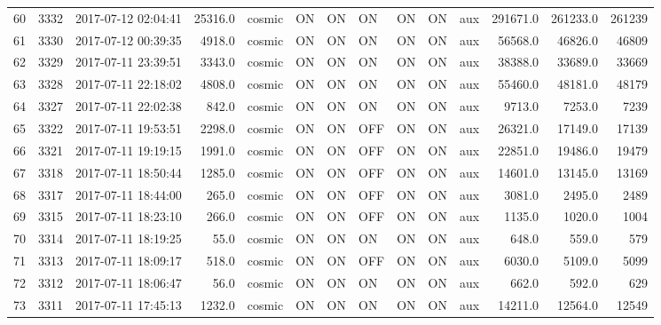 \begin{longtable}{lrlrlllllllrrr}
60  &  3332 &  2017-07-12 02:04:41 &   25316.0 &   cosmic &  ON &   ON &   ON &  ON &   ON &       aux &    291671.0 &     261233.0 &              261239 \\
61  &  3330 &  2017-07-12 00:39:35 &    4918.0 &   cosmic &  ON &   ON &   ON &  ON &   ON &       aux &     56568.0 &      46826.0 &               46809 \\
62  &  3329 &  2017-07-11 23:39:51 &    3343.0 &   cosmic &  ON &   ON &   ON &  ON &   ON &       aux &     38388.0 &      33689.0 &               33669 \\
63  &  3328 &  2017-07-11 22:18:02 &    4808.0 &   cosmic &  ON &   ON &   ON &  ON &   ON &       aux &     55460.0 &      48181.0 &               48179 \\
64  &  3327 &  2017-07-11 22:02:38 &     842.0 &   cosmic &  ON &   ON &   ON &  ON &   ON &       aux &      9713.0 &       7253.0 &                7239 \\
65  &  3322 &  2017-07-11 19:53:51 &    2298.0 &   cosmic &  ON &   ON &  OFF &  ON &   ON &       aux &     26321.0 &      17149.0 &               17139 \\
66  &  3321 &  2017-07-11 19:19:15 &    1991.0 &   cosmic &  ON &   ON &  OFF &  ON &   ON &       aux &     22851.0 &      19486.0 &               19479 \\
67  &  3318 &  2017-07-11 18:50:44 &    1285.0 &   cosmic &  ON &   ON &  OFF &  ON &   ON &       aux &     14601.0 &      13145.0 &               13169 \\
68  &  3317 &  2017-07-11 18:44:00 &     265.0 &   cosmic &  ON &   ON &  OFF &  ON &   ON &       aux &      3081.0 &       2495.0 &                2489 \\
69  &  3315 &  2017-07-11 18:23:10 &     266.0 &   cosmic &  ON &   ON &  OFF &  ON &   ON &       aux &      1135.0 &       1020.0 &                1004 \\
70  &  3314 &  2017-07-11 18:19:25 &      55.0 &   cosmic &  ON &   ON &   ON &  ON &   ON &       aux &       648.0 &        559.0 &                 579 \\
71  &  3313 &  2017-07-11 18:09:17 &     518.0 &   cosmic &  ON &   ON &  OFF &  ON &   ON &       aux &      6030.0 &       5109.0 &                5099 \\
72  &  3312 &  2017-07-11 18:06:47 &      56.0 &   cosmic &  ON &   ON &   ON &  ON &   ON &       aux &       662.0 &        592.0 &                 629 \\
73  &  3311 &  2017-07-11 17:45:13 &    1232.0 &   cosmic &  ON &   ON &   ON &  ON &   ON &       aux &     14211.0 &      12564.0 &               12549 \\

\end{longtable}
